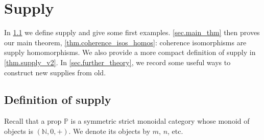 \documentclass[11pt, oneside, article]{memoir}
\theoremstyle{plain}
\theoremstyle{definition}
\theoremstyle{remark}
\newcommand{\nn}{\mathbb{N}}
\newcommand{\pp}{\mathbb{P}}
\begin{document}
\chapter{Supply}

In \cref{sec.supply} we define supply and give some first examples. \cref{sec.main_thm} then proves our main theorem, \cref{thm.coherence_isos_homos}: coherence isomorphisms are supply homomorphisms. We also provide a more compact definition of supply in \cref{thm.supply_v2}. In \cref{sec.further_theory}, we record some useful ways to construct new supplies from old. 

\section{Definition of supply}\label{sec.supply}

Recall that a prop $\pp$ is a symmetric strict monoidal category whose monoid of objects is $(\nn,0,+)$. We denote its objects by $m$, $n$, etc.
\end{document}
